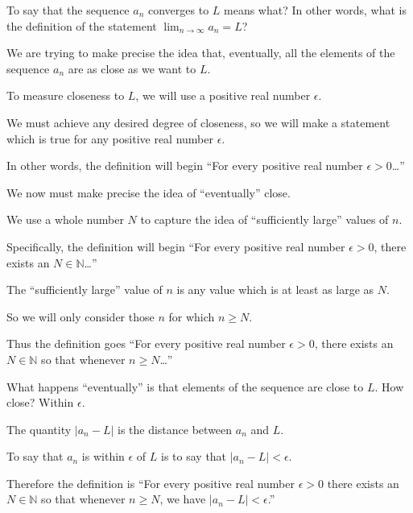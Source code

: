 \documentclass{ximera}
\begin{document}
\begin{question}
  To say that the sequence $a_n$ converges to $L$ means what?  In other words, what is the definition of the statement $\lim_{n \to \infty} a_n = L$?

    \begin{hint}
      We are trying to make precise the idea that, eventually, all the elements of the sequence $a_n$ are as close as we want to $L$.
    \end{hint}
    \begin{hint}
      To measure closeness to $L$, we will use a positive real number $\epsilon$.
    \end{hint}
    \begin{hint}
      We must achieve any desired degree of closeness, so we will make a statement which is true for any positive real number $\epsilon$.
    \end{hint}
    \begin{hint}
      In other words, the definition will begin ``For every positive real number $\epsilon > 0$\ldots''
    \end{hint}
    \begin{hint}
      We now must make precise the idea of ``eventually'' close.
    \end{hint}
    \begin{hint}
      We use a whole number $N$ to capture the idea of ``sufficiently large'' values of $n$.
    \end{hint}
    \begin{hint}
      Specifically, the definition will begin ``For every positive real number $\epsilon > 0$, there exists an $N \in \mathbb{N}$\ldots''
    \end{hint}
    \begin{hint}
      The ``sufficiently large'' value of $n$ is any value which is at least as large as $N$.
    \end{hint}
    \begin{hint}
      So we will only consider those $n$ for which $n \ge N$.
    \end{hint}
    \begin{hint}
      Thus the definition goes ``For every positive real number $\epsilon > 0$, there exists an $N \in \mathbb{N}$ so that whenever $n \ge N$\ldots''
    \end{hint}
    \begin{hint}
      What happens ``eventually'' is that elements of the sequence are close to $L$.  How close?  Within $\epsilon$.
    \end{hint}
    \begin{hint}
      The quantity $|a_n - L|$ is the distance between $a_n$ and $L$.
    \end{hint}
    \begin{hint}
      To say that $a_n$ is within $\epsilon$ of $L$ is to say that $|a_n - L| < \epsilon$.
    \end{hint}
    \begin{hint}
      Therefore the definition is ``For every positive real number $\epsilon > 0$ there exists an $N \in \mathbb{N}$ so that whenever $n \ge N$, we have $ |a_n - L| < \epsilon $.''
    \end{hint}


\end{question}
\end{document}
